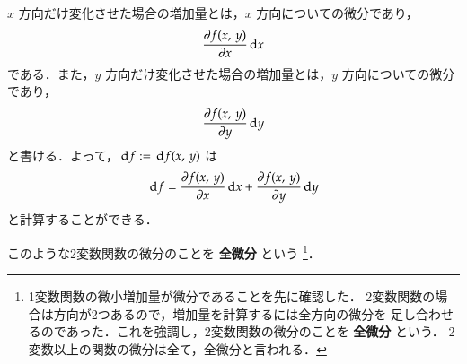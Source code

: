                                $x$ 方向だけ変化させた場合の増加量とは，$x$ 方向についての微分であり，
                                        \begin{equation*}
                                                \frac{\partial f(x,\,y)}{\partial x} \,\mathrm{d} x
                                        \end{equation*}
                            である．また，$y$ 方向だけ変化させた場合の増加量とは，$y$ 方向についての微分であり，
                                        \begin{equation*}
                                                \frac{\partial f(x,\,y)}{\partial y} \,\mathrm{d} y
                                        \end{equation*}
                            と書ける．よって，$\,\mathrm{d} f:=\,\mathrm{d} f(x,\,y)$ は
                                \begin{align}
                                        \,\mathrm{d} f = \frac{\partial f(x,\,y)}{\partial x} \,\mathrm{d} x + \frac{\partial f(x,\,y)}{\partial y} \,\mathrm{d} y
                                \end{align}
                            と計算することができる．

                            このような2変数関数の微分のことを \textbf{全微分} という
                                \footnote{
                                                1変数関数の微小増加量が微分であることを先に確認した．
                                2変数関数の場合は方向が2つあるので，増加量を計算するには全方向の微分を
                                足し合わせるのであった．これを強調し，2変数関数の微分のことを \textbf{全微分} という．
                                2変数以上の関数の微分は全て，全微分と言われる．
                                }．
